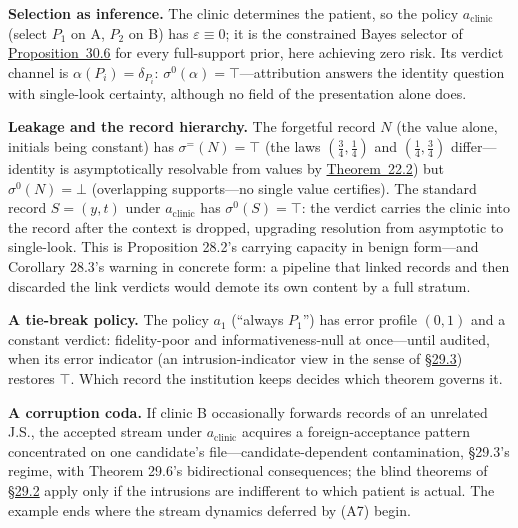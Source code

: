 \textbf{Selection as inference.} The clinic determines the patient, so the policy \(a_{\mathrm{clinic}}\) (select \(P_1\) on A, \(P_2\) on B) has \(\varepsilon \equiv 0\); it is the constrained Bayes selector of \hyperlink{stmt:30.6}{Proposition~30.6} for every full-support prior, here achieving zero risk. Its verdict channel is \(\alpha(P_i) = \delta_{P_i}\): \(\sigma^0(\alpha) = \top\)---\hspace{0pt}attribution answers the identity question with single-look certainty, although no field of the presentation alone does.

\textbf{Leakage and the record hierarchy.} The forgetful record \(N\) (the value alone, initials being constant) has \(\sigma^=(N) = \top\) (the laws \((\tfrac34, \tfrac14)\) and \((\tfrac14, \tfrac34)\) differ---\hspace{0pt}identity is asymptotically resolvable from values by \hyperlink{stmt:22.2}{Theorem~22.2}) but \(\sigma^0(N) = \bot\) (overlapping supports---\hspace{0pt}no single value certifies). The standard record \(S = (y, t)\) under \(a_{\mathrm{clinic}}\) has \(\sigma^0(S) = \top\): the verdict carries the clinic into the record after the context is dropped, upgrading resolution from asymptotic to single-look. This is Proposition 28.2's carrying capacity in benign form---\hspace{0pt}and Corollary 28.3's warning in concrete form: a pipeline that linked records and then discarded the link verdicts would demote its own content by a full stratum.

\textbf{A tie-break policy.} The policy \(a_1\) (``always \(P_1\)'') has error profile \((0, 1)\) and a constant verdict: fidelity-poor and informativeness-null at once---\hspace{0pt}until audited, when its error indicator (an intrusion-indicator view in the sense of \hyperlink{sec:29.3}{§29.3}) restores \(\top\). Which record the institution keeps decides which theorem governs it.

\textbf{A corruption coda.} If clinic B occasionally forwards records of an unrelated J.S., the accepted stream under \(a_{\mathrm{clinic}}\) acquires a foreign-acceptance pattern concentrated on one candidate's file---\hspace{0pt}candidate-dependent contamination, §29.3's regime, with Theorem 29.6's bidirectional consequences; the blind theorems of \hyperlink{sec:29.2}{§29.2} apply only if the intrusions are indifferent to which patient is actual. The example ends where the stream dynamics deferred by (A7) begin.

